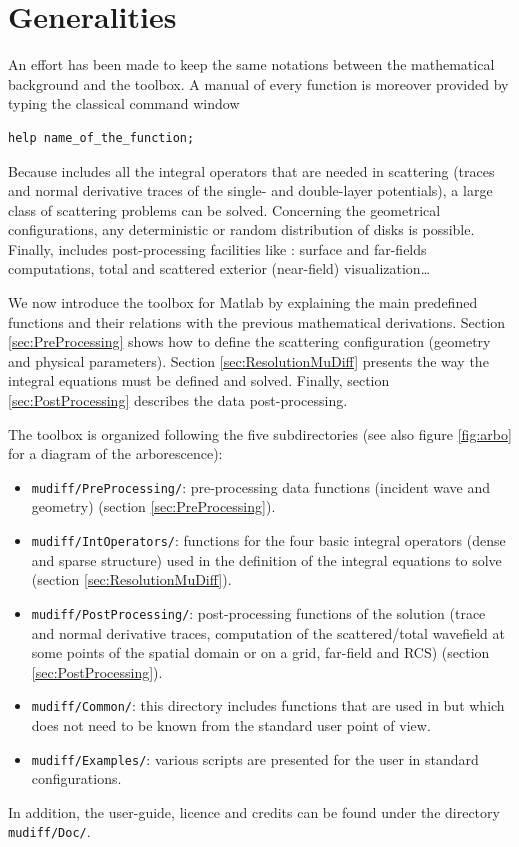 \section{Generalities}
An effort has been made to keep the same notations between the mathematical background and the \mudiff toolbox. A manual of every function is moreover provided by typing the classical \matlab command window 
\begin{lstlisting}
help name_of_the_function;
\end{lstlisting}

Because \mudiff includes all the integral operators that are needed in scattering (traces and normal derivative
traces of the single- and double-layer potentials), a large class of scattering problems can be solved. 
Concerning the geometrical configurations, any deterministic or random distribution of disks is possible. Finally,
\mudiff includes post-processing facilities like \eg: surface and far-fields computations, total and scattered exterior (near-field)
visualization\ldots

We now introduce the \mudiff  toolbox for Matlab by explaining the main predefined functions and their relations
with the previous mathematical derivations.
Section \ref{sec:PreProcessing}  shows how to define the scattering configuration (geometry and physical parameters). Section
 \ref{sec:ResolutionMuDiff}  presents the way the integral equations must be defined and solved.
  Finally, section \ref{sec:PostProcessing} describes the data post-processing. 

The \mudiff toolbox  is organized following the five subdirectories (see also figure \ref{fig:arbo} for a diagram of the arborescence):
\begin{itemize}
\item \texttt{mudiff/PreProcessing/}: pre-processing data functions (incident wave and geometry) (section \ref{sec:PreProcessing}).
\item \texttt{mudiff/IntOperators/}: functions for the four basic integral operators (dense and sparse structure)
used in the definition of the integral equations to solve (section \ref{sec:ResolutionMuDiff}). 
\item \texttt{mudiff/PostProcessing/}: post-processing functions of the solution (trace and normal derivative traces,
computation of the scattered/total wavefield 
at some points of the spatial domain or on a grid, far-field and RCS) 
(section \ref{sec:PostProcessing}).
\item \texttt{mudiff/Common/}: this directory includes functions that are used in \mudiff but which does not need to be known
from the standard user point of view.
\item \texttt{mudiff/Examples/}: various scripts are presented for the user in standard configurations.
\end{itemize}
In addition, the \mudiff user-guide, licence and credits can be found under the directory \texttt{mudiff/Doc/}.


